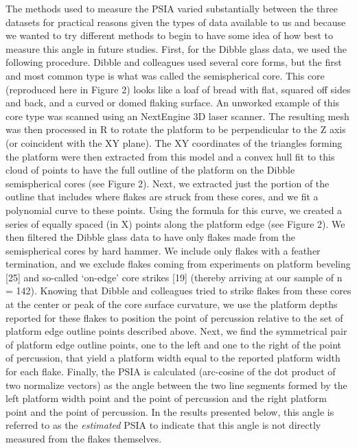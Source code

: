\documentclass[10pt,letterpaper]{article}
\begin{document}
The methods used to measure the PSIA varied substantially between the
three datasets for practical reasons given the types of data available
to us and because we wanted to try different methods to begin to have
some idea of how best to measure this angle in future studies. First,
for the Dibble glass data, we used the following procedure. Dibble and
colleagues used several core forms, but the first and most common type
is what was called the semispherical core. This core (reproduced here in
Figure 2) looks like a loaf of bread with flat, squared off sides and
back, and a curved or domed flaking surface. An unworked example of this
core type was scanned using an NextEngine 3D laser scanner. The
resulting mesh was then processed in R to rotate the platform to be
perpendicular to the Z axis (or coincident with the XY plane). The XY
coordinates of the triangles forming the platform were then extracted
from this model and a convex hull fit to this cloud of points to have
the full outline of the platform on the Dibble semispherical cores (see
Figure 2). Next, we extracted just the portion of the outline that
includes where flakes are struck from these cores, and we fit a
polynomial curve to these points. Using the formula for this curve, we
created a series of equally spaced (in X) points along the platform edge
(see Figure 2). We then filtered the Dibble glass data to have only
flakes made from the semispherical cores by hard hammer. We include only
flakes with a feather termination, and we exclude flakes coming from
experiments on platform beveling {[}25{]} and so-called `on-edge' core
strikes {[}19{]} (thereby arriving at our sample of n = 142). Knowing
that Dibble and colleagues tried to strike flakes from these cores at
the center or peak of the core surface curvature, we use the platform
depths reported for these flakes to position the point of percussion
relative to the set of platform edge outline points described above.
Next, we find the symmetrical pair of platform edge outline points, one
to the left and one to the right of the point of percussion, that yield
a platform width equal to the reported platform width for each flake.
Finally, the PSIA is calculated (arc-cosine of the dot product of two
normalize vectors) as the angle between the two line segments formed by
the left platform width point and the point of percussion and the right
platform point and the point of percussion. In the results presented
below, this angle is referred to as the \emph{estimated} PSIA to
indicate that this angle is not directly measured from the flakes
themselves.
\end{document}

